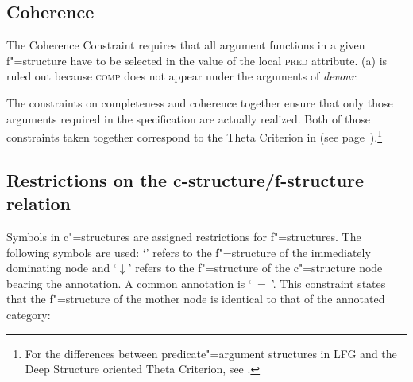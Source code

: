 \eal
{}
\zl

\subsection{Coherence}

The Coherence Constraint requires that all argument functions in a given f"=structure have to be selected in the value of the local 
 \textsc{pred} attribute. (a) is ruled out because \textsc{comp} does not appear under the arguments of \emph{devour}.

\eal
{}
\zl

\noindent
The constraints on completeness and coherence together ensure that only those arguments required in
the \pred specification are actually realized.
Both of those constraints taken together correspond to the Theta Criterion in \gbt (see
page~\pageref{theta-Kriterium}).\footnote{
For the differences between predicate"=argument structures in LFG and the Deep Structure oriented Theta Criterion, see .} 

\subsection{Restrictions on the c-structure/f-structure relation}

Symbols in c"=structures are assigned restrictions for f"=structures. The following symbols are used: `\up'\is{$\uparrow$} refers to the f"=structure of the
immediately dominating node and `$\downarrow$'\is{$\downarrow$} refers to the f"=structure of the c"=structure node bearing the annotation. A common annotation is
`\up~=~\down'. This constraint states that the f"=structure of the mother node is identical to that of the annotated category:

